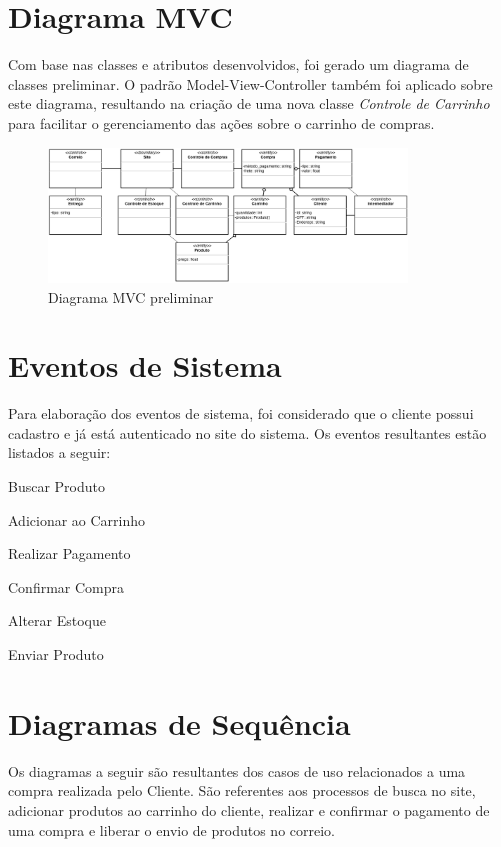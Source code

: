 \documentclass[12pt,a4paper]{article}
\begin{document}
\section{Diagrama MVC}
Com base nas classes e atributos desenvolvidos, foi gerado um diagrama de classes preliminar.
O padrão Model-View-Controller também foi aplicado sobre este diagrama, resultando na criação de uma nova classe \textit{Controle de Carrinho} para facilitar o gerenciamento das ações sobre o carrinho de compras.
\begin{figure}[h!]
\centering
\includegraphics[width=0.85\textwidth]{img/MVC}
\caption{Diagrama MVC preliminar}
\end{figure}
\section{Eventos de Sistema}
Para elaboração dos eventos de sistema, foi considerado que o cliente possui cadastro e já está autenticado no site do sistema.
Os eventos resultantes estão listados a seguir:

\begin{inparaenum}
\item Buscar Produto
\tab\item Adicionar ao Carrinho
\tab\item Realizar Pagamento
\tab\item Confirmar Compra
\tab\item Alterar Estoque
\tab\item Enviar Produto
\end{inparaenum}



\section{Diagramas de Sequência}
Os diagramas a seguir são resultantes dos casos de uso relacionados a uma compra realizada pelo Cliente.
São referentes aos processos de busca no site, adicionar produtos ao carrinho do cliente, realizar e confirmar o pagamento de uma compra e liberar o envio de produtos no correio.
\end{document}
